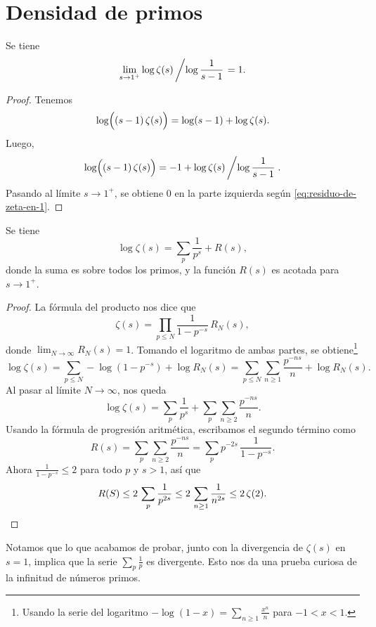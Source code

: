 
\section{Densidad de primos}

\begin{lema}
  \label{lema:log-zeta-log-sm1}
  Se tiene
  $$\lim_{s\to 1^+} \log \zeta (s)\left/\log \frac{1}{s-1}\right. = 1.$$

  \begin{proof}
    Tenemos
    $$\log \Bigl((s-1)\,\zeta (s)\Bigr) = \log (s-1) + \log \zeta (s).$$
    Luego,
    \[ \log \Bigl((s-1)\,\zeta (s)\Bigr) =
       -1 + \log \zeta (s)\left/\log \frac{1}{s-1}\right.. \]
    Pasando al límite $s \to 1^+$, se obtiene $0$ en la parte izquierda
    según \eqref{eq:residuo-de-zeta-en-1}.
  \end{proof}
\end{lema}

\begin{lema}
  \label{lema:log-zeta}
  Se tiene
  $$\log \zeta (s) = \sum_p \frac{1}{p^s} + R (s),$$
  donde la suma es sobre todos los primos, y la función $R (s)$ es acotada para
  $s \to 1^+$.

  \begin{proof}
    La fórmula del producto nos dice que
    $$\zeta (s) = \prod_{p \le N} \frac{1}{1 - p^{-s}}\,R_N (s),$$
    donde $\lim_{N\to\infty} R_N (s) = 1$. Tomando el logaritmo de ambas partes,
    se obtiene\footnote{Usando la serie del logaritmo
      $-\log (1-x) = \sum_{n\ge 1} \frac{x^n}{n}$ para $-1 < x < 1$.}
    \[ \log \zeta (s) = \sum_{p \le N} -\log (1 - p^{-s}) + \log R_N (s) =
    \sum_{p\le N} \sum_{n\ge 1} \frac{p^{-ns}}{n} + \log R_N (s). \]
    Al pasar al límite $N \to \infty$, nos queda
    \[ \log \zeta (s) =
       \sum_p \frac{1}{p^s} + \sum_p \sum_{n \ge 2} \frac{p^{-ns}}{n}. \]
    Usando la fórmula de progresión aritmética, escribamos el segundo
    término como
    $$R (s) = \sum_p \sum_{n \ge 2} \frac{p^{-ns}}{n} = \sum_p p^{-2s}\,\frac{1}{1 - p^{-s}}.$$
    Ahora $\frac{1}{1 - p^{-s}} \le 2$ para todo $p$ y $s > 1$, así que
    \[ R (S) \le 2\,\sum_p \frac{1}{p^{2s}} \le 2\,\sum_{n\ge 1} \frac{1}{n^{2s}} \le 2\,\zeta (2). \qedhere \]
  \end{proof}
\end{lema}

Notamos que lo que acabamos de probar, junto con la divergencia de $\zeta (s)$
en $s=1$, implica que la serie $\sum_p \frac{1}{p}$ es divergente. Esto nos da
una prueba curiosa de la infinitud de números primos.

